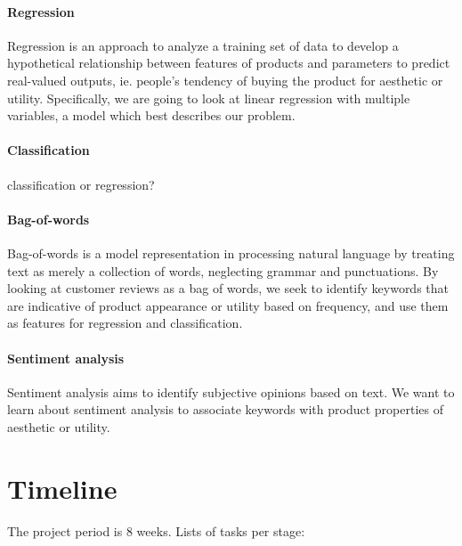 \documentclass[dvips,12pt]{article}
\begin{document}
\paragraph{Regression} 
Regression is an approach to analyze a training set of data to develop a hypothetical relationship between features of products and parameters to predict real-valued outputs, ie. people's tendency of buying the product for aesthetic or utility. Specifically, we are going to look at linear regression with multiple variables, a model which best describes our problem.
	
\paragraph{Classification}
classification or regression?
	
\paragraph{Bag-of-words}
Bag-of-words is a model representation in processing natural language by treating text as merely a collection of words, neglecting grammar and punctuations. By looking at customer reviews as a bag of words, we seek to identify keywords that are indicative of product appearance or utility based on frequency, and use them as features for regression and classification.
	
\paragraph{Sentiment analysis}
Sentiment analysis aims to identify subjective opinions based on text. We want to learn about sentiment analysis to associate keywords with product properties of aesthetic or utility.

\section{Timeline}
The project period is 8 weeks. Lists of tasks per stage:
\end{document}
